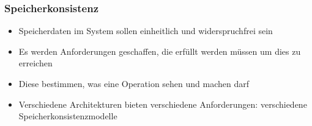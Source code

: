 \documentclass{sikslides}
\begin{document}
\begin{frame}
	\frametitle{Speicherkonsistenz}
	\begin{itemize}
		\item Speicherdaten im System sollen einheitlich und widerspruchfrei sein
\bigskip
		\item Es werden Anforderungen geschaffen, die erfüllt werden müssen um dies zu erreichen
\bigskip
		\item Diese bestimmen, was eine Operation sehen und machen darf
\bigskip
		\item Verschiedene Architekturen bieten verschiedene Anforderungen: verschiedene Speicherkonsistenzmodelle
	\end{itemize}
\end{frame}


\end{document}
